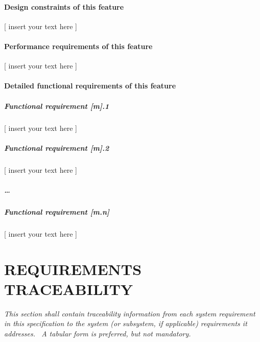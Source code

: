 \documentclass[twoside,letterpaper]{article}
\begin{document}
\paragraph[Design constraints of this
feature]{\rmfamily\bfseries\color{black} Design
constraints of this feature}
{\color{black}
[ insert your text here ]}

\paragraph[Performance requirements of this
feature]{\rmfamily\bfseries\color{black}
Performance requirements of this feature}
{\color{black}
[ insert your text here ]}

\paragraph[Detailed functional requirements of this
feature]{\rmfamily\bfseries\color{black}
Detailed functional requirements of this feature}
\subparagraph{Functional requirement [m].1}
{\color{black}
[ insert your text here ]}

\subparagraph[Functional requirement [m{]}.2]{Functional requirement
[m].2}
{\color{black}
[ insert your text here ]}

\subparagraph{{\dots}}
\subparagraph{Functional requirement [m.n]}
{\color{black}
[ insert your text here ]}



\clearpage\pagestyle{Standard}
\section[REQUIREMENTS
TRACEABILITY]{\rmfamily\bfseries\color{black}
REQUIREMENTS TRACEABILITY}
{\itshape\color{black}
This section shall contain traceability information from each system
requirement in this specification to the system (or subsystem, if
applicable) requirements it addresses. \ A tabular form is preferred,
but not mandatory.}


\bigskip
\end{document}
